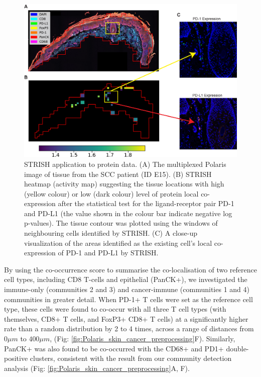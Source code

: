 \begin{figure}[htp]
    \centering
    \includegraphics[width=0.8\columnwidth]{Chapter3/Figures/Chapter2_Fig3.jpg}
    \caption[STRISH application to protein data.]{STRISH application to protein data. (A) The multiplexed Polaris image of tissue from the SCC patient (ID E15). (B) STRISH heatmap (activity map) suggesting the tissue locations with high (yellow colour) or low (dark colour) level of protein local co-expression after the statistical test for the ligand-receptor pair PD-1 and PD-L1 (the value shown in the colour bar indicate negative log p-values). The tissue contour was plotted using the windows of neighbouring cells identified by STRISH. (C) A close-up visualization of the areas identified as the existing cell's local co-expression of PD-1 and PD-L1 by STRISH.}
    \label{fig:Chap3_figure3_zoom_in}
\end{figure}

By using the co-occurrence score to summarise the co-localisation of two reference cell types, including CD8 T-cells and epithelial (PanCK+), we investigated the immune-only (communities 2 and 3) and cancer-immune (communities 1 and 4) communities in greater detail. When PD-1+ T cells were set as the reference cell type, these cells were found to co-occur with all three T cell types (\ie with themselves, CD8+ T cells, and FoxP3+ CD8+ T cells) at a significantly higher rate than a random distribution by 2 to 4 times, across a range of distances from $0\mu m$ to $400 \mu m$, (Fig: \ref{fig:Polaris_skin_cancer_preprocessing}F). Similarly, PanCK+ was also found to be co-occurred with the CD68+ and PD1+ double-positive clusters, consistent with the result from our community detection analysis (Fig: \ref{fig:Polaris_skin_cancer_preprocessing}A, F).    

